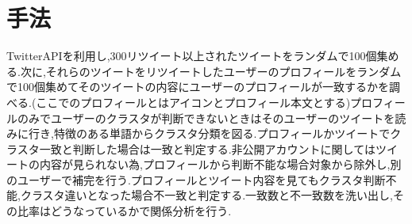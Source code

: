 \documentclass[uplatex,twocolumn,dvipdfmx]{jsarticle}
\begin{document}
\section{手法}
TwitterAPIを利用し,300リツイート以上されたツイートをランダムで100個集める.次に,それらのツイートをリツイートしたユーザーのプロフィールをランダムで100個集めてそのツイートの内容にユーザーのプロフィールが一致するかを調べる.(ここでのプロフィールとはアイコンとプロフィール本文とする)\cite{soturon2014}プロフィールのみでユーザーのクラスタが判断できないときはそのユーザーのツイートを読みに行き,特徴のある単語からクラスタ分類を図る.プロフィールかツイートでクラスタ一致と判断した場合は一致と判定する.非公開アカウントに関してはツイートの内容が見られない為,プロフィールから判断不能な場合対象から除外し,別のユーザーで補完を行う.プロフィールとツイート内容を見てもクラスタ判断不能,クラスタ違いとなった場合不一致と判定する.一致数と不一致数を洗い出し,その比率はどうなっているかで関係分析を行う.



\end{document}
